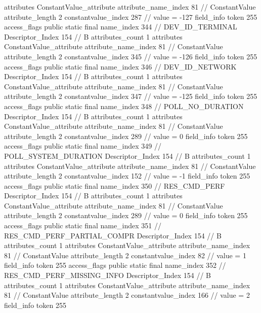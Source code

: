{{{{{				attributes {
				ConstantValue_attribute {
					attribute_name_index	81		// ConstantValue
					attribute_length	2
					constantvalue_index	287		// value = -127
				}
				}
			}
			field_info {
				token	255
				access_flags	public static final
				name_index	344		// DEV_ID_TERMINAL
				Descriptor_Index	154		// B
				attributes_count	1
				attributes {
				ConstantValue_attribute {
					attribute_name_index	81		// ConstantValue
					attribute_length	2
					constantvalue_index	345		// value = -126
				}
				}
			}
			field_info {
				token	255
				access_flags	public static final
				name_index	346		// DEV_ID_NETWORK
				Descriptor_Index	154		// B
				attributes_count	1
				attributes {
				ConstantValue_attribute {
					attribute_name_index	81		// ConstantValue
					attribute_length	2
					constantvalue_index	347		// value = -125
				}
				}
			}
			field_info {
				token	255
				access_flags	public static final
				name_index	348		// POLL_NO_DURATION
				Descriptor_Index	154		// B
				attributes_count	1
				attributes {
				ConstantValue_attribute {
					attribute_name_index	81		// ConstantValue
					attribute_length	2
					constantvalue_index	289		// value = 0
				}
				}
			}
			field_info {
				token	255
				access_flags	public static final
				name_index	349		// POLL_SYSTEM_DURATION
				Descriptor_Index	154		// B
				attributes_count	1
				attributes {
				ConstantValue_attribute {
					attribute_name_index	81		// ConstantValue
					attribute_length	2
					constantvalue_index	152		// value = -1
				}
				}
			}
			field_info {
				token	255
				access_flags	public static final
				name_index	350		// RES_CMD_PERF
				Descriptor_Index	154		// B
				attributes_count	1
				attributes {
				ConstantValue_attribute {
					attribute_name_index	81		// ConstantValue
					attribute_length	2
					constantvalue_index	289		// value = 0
				}
				}
			}
			field_info {
				token	255
				access_flags	public static final
				name_index	351		// RES_CMD_PERF_PARTIAL_COMPR
				Descriptor_Index	154		// B
				attributes_count	1
				attributes {
				ConstantValue_attribute {
					attribute_name_index	81		// ConstantValue
					attribute_length	2
					constantvalue_index	82		// value = 1
				}
				}
			}
			field_info {
				token	255
				access_flags	public static final
				name_index	352		// RES_CMD_PERF_MISSING_INFO
				Descriptor_Index	154		// B
				attributes_count	1
				attributes {
				ConstantValue_attribute {
					attribute_name_index	81		// ConstantValue
					attribute_length	2
					constantvalue_index	166		// value = 2
				}
				}
			}
			field_info {
				token	255
}}}}}
